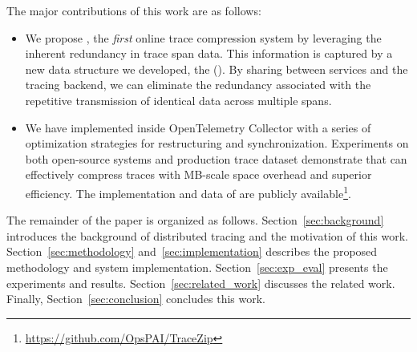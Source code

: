 The major contributions of this work are as follows:

\begin{itemize}
    \item We propose \alias, the \textit{first} online trace compression system by leveraging the inherent redundancy in trace span data.
    This information is captured by a new data structure we developed, the \name (\sname).
    By sharing \sname between services and the tracing backend, we can eliminate the redundancy associated with the repetitive transmission of identical data across multiple spans.

    \item We have implemented \alias inside OpenTelemetry Collector with a series of optimization strategies for \sname restructuring and synchronization.
    Experiments on both open-source systems and production trace dataset demonstrate that \alias can effectively compress traces with MB-scale space overhead and superior efficiency.
    The implementation and data of \alias are publicly available\footnote{\url{https://github.com/OpsPAI/TraceZip}}.
\end{itemize}

The remainder of the paper is organized as follows.
Section~\ref{sec:background} introduces the background of distributed tracing and the motivation of this work.
Section~\ref{sec:methodology} and~\ref{sec:implementation} describes the proposed methodology and system implementation.
Section~\ref{sec:exp_eval} presents the experiments and results. 
Section~\ref{sec:related_work} discusses the related work.
Finally, Section~\ref{sec:conclusion} concludes this work.



